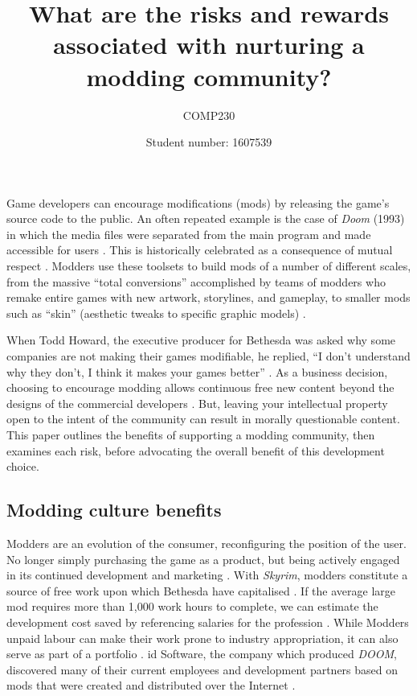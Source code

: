 \documentclass{scrartcl}
\title{What are the risks and rewards associated with nurturing a modding community?}
\subtitle{COMP230}
\author{Student number: 1607539}
\begin{document}
\maketitle

Game developers can encourage modifications (mods) by releasing the game's source code to the public. An often repeated example is the case of \textit{Doom} (1993) in which the media files were separated from the main program and made accessible for users \cite{sotamaa2010game}. This is historically celebrated as a consequence of mutual respect \cite{hong2013game}. Modders use these toolsets to build mods of a number of different scales, from the massive ``total conversions'' accomplished by teams of modders who remake entire games with new artwork, storylines, and gameplay, to smaller mods such as ``skin'' (aesthetic tweaks to specific graphic models) \cite{hong2014becoming}.  

When Todd Howard, the executive producer for Bethesda was asked why some companies are not making their games modifiable, he replied, ``I don't understand why they don't, I think it makes your games better'' \cite{todd2012}. As a business decision, choosing to encourage modding allows continuous free new content beyond the designs of the commercial developers \cite{postigo2007mods}. But, leaving your intellectual property open to the intent of the community can result in morally questionable content. This paper outlines the benefits of supporting a modding community, then examines each risk, before advocating the overall benefit of this development choice.

\subsection*{Modding culture benefits}

Modders are an evolution of the consumer, reconfiguring the position of the user. No longer simply purchasing the game as a product, but being actively engaged in its continued development and marketing \cite{herman2006your}. With \textit{Skyrim}, modders constitute a source of free work upon which Bethesda have capitalised \cite{hong2013game}. If the average large mod requires more than 1,000 work hours to complete, we can estimate the development cost saved by referencing salaries for the profession \cite{postigo2007mods}. While Modders unpaid labour can make their work prone to industry appropriation, it can also serve as part of a portfolio \cite{nieborg2008mod}. id Software, the company which produced \textit{DOOM}, discovered many of their current employees and development partners based on mods that were created and distributed over the Internet \cite{hong2014becoming}. 
\end{document}
